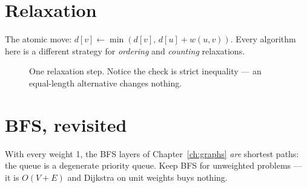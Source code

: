 \section{Relaxation}\label{sec:relax}
The atomic move: $d[v] \leftarrow \min(d[v],\, d[u] + w(u,v))$. Every
algorithm here is a different strategy for \emph{ordering} and
\emph{counting} relaxations.
\begin{figure}[ht]\centering

\caption{One relaxation step. Notice the check is strict inequality
--- an equal-length alternative changes nothing.}
\label{fig:relax}
\end{figure}

\section{BFS, revisited}\label{sec:bfs2}
With every weight 1, the BFS layers of Chapter~\ref{ch:graphs}
\emph{are} shortest paths: the queue is a degenerate priority queue.
Keep BFS for unweighted problems --- it is $O(V{+}E)$ and Dijkstra on
unit weights buys nothing.

